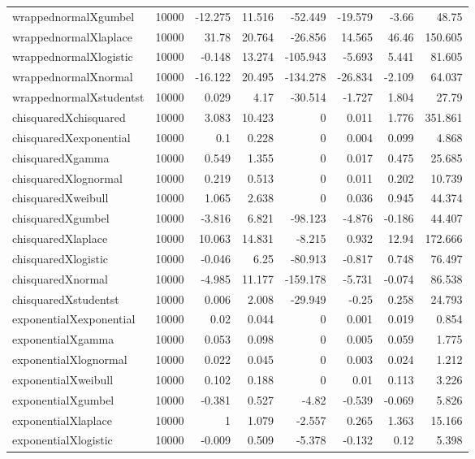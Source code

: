 \begin{table}[!htbp]
{\begin{tabular}{lrrrrrrr}
wrappednormalXgumbel & 10000 & -12.275 & 11.516 & -52.449 & -19.579 & -3.66 & 48.75 \\ 
wrappednormalXlaplace & 10000 & 31.78 & 20.764 & -26.856 & 14.565 & 46.46 & 150.605 \\ 
wrappednormalXlogistic & 10000 & -0.148 & 13.274 & -105.943 & -5.693 & 5.441 & 81.605 \\ 
wrappednormalXnormal & 10000 & -16.122 & 20.495 & -134.278 & -26.834 & -2.109 & 64.037 \\ 
wrappednormalXstudentst & 10000 & 0.029 & 4.17 & -30.514 & -1.727 & 1.804 & 27.79 \\ 
chisquaredXchisquared & 10000 & 3.083 & 10.423 & 0 & 0.011 & 1.776 & 351.861 \\ 
chisquaredXexponential & 10000 & 0.1 & 0.228 & 0 & 0.004 & 0.099 & 4.868 \\ 
chisquaredXgamma & 10000 & 0.549 & 1.355 & 0 & 0.017 & 0.475 & 25.685 \\ 
chisquaredXlognormal & 10000 & 0.219 & 0.513 & 0 & 0.011 & 0.202 & 10.739 \\ 
chisquaredXweibull & 10000 & 1.065 & 2.638 & 0 & 0.036 & 0.945 & 44.374 \\ 
chisquaredXgumbel & 10000 & -3.816 & 6.821 & -98.123 & -4.876 & -0.186 & 44.407 \\ 
chisquaredXlaplace & 10000 & 10.063 & 14.831 & -8.215 & 0.932 & 12.94 & 172.666 \\ 
chisquaredXlogistic & 10000 & -0.046 & 6.25 & -80.913 & -0.817 & 0.748 & 76.497 \\ 
chisquaredXnormal & 10000 & -4.985 & 11.177 & -159.178 & -5.731 & -0.074 & 86.538 \\ 
chisquaredXstudentst & 10000 & 0.006 & 2.008 & -29.949 & -0.25 & 0.258 & 24.793 \\ 
exponentialXexponential & 10000 & 0.02 & 0.044 & 0 & 0.001 & 0.019 & 0.854 \\ 
exponentialXgamma & 10000 & 0.053 & 0.098 & 0 & 0.005 & 0.059 & 1.775 \\ 
exponentialXlognormal & 10000 & 0.022 & 0.045 & 0 & 0.003 & 0.024 & 1.212 \\ 
exponentialXweibull & 10000 & 0.102 & 0.188 & 0 & 0.01 & 0.113 & 3.226 \\ 
exponentialXgumbel & 10000 & -0.381 & 0.527 & -4.82 & -0.539 & -0.069 & 5.826 \\ 
exponentialXlaplace & 10000 & 1 & 1.079 & -2.557 & 0.265 & 1.363 & 15.166 \\ 
exponentialXlogistic & 10000 & -0.009 & 0.509 & -5.378 & -0.132 & 0.12 & 5.398 \\ 

\end{tabular}}
\end{table}
